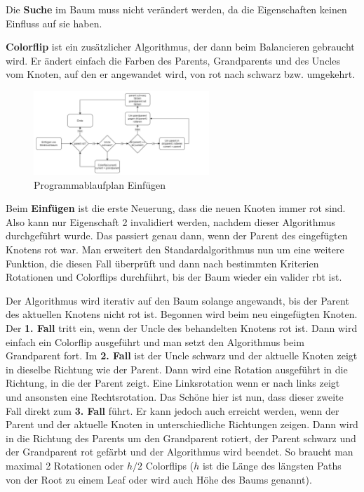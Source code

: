 \documentclass[11pt]{article}
\begin{document}
Die \textbf{Suche} im Baum muss nicht verändert werden, da die Eigenschaften keinen Einfluss auf sie haben. \cite[S. 221]{aic}

\textbf{Colorflip} ist ein zusätzlicher Algorithmus, der dann beim Balancieren gebraucht wird.
Er ändert einfach die Farben des Parents, Grandparents und des Uncles vom Knoten, auf den er angewandet wird, von rot nach schwarz bzw. umgekehrt.

\begin{figure}
  \centering
  \includegraphics[width=250px]{prog1.png}
  \caption{Programmablaufplan Einfügen}
\end{figure}

Beim \textbf{Einfügen} ist die erste Neuerung, dass die neuen Knoten immer rot sind. 
Also kann nur Eigenschaft 2 invalidiert werden, nachdem dieser Algorithmus durchgeführt wurde. 
Das passiert genau dann, wenn der Parent des eingefügten Knotens rot war. Man erweitert den Standardalgorithmus nun um eine weitere Funktion, 
die diesen Fall überprüft und dann nach bestimmten Kriterien Rotationen und Colorflips durchführt, bis der Baum wieder ein valider \gls{rbt} ist.

Der Algorithmus wird iterativ auf den Baum solange angewandt, bis der Parent des aktuellen Knotens nicht rot ist. 
Begonnen wird beim neu eingefügten Knoten. Der \textbf{1. Fall} tritt ein, wenn der Uncle des behandelten Knotens rot ist. 
Dann wird einfach ein Colorflip ausgeführt und man setzt den Algorithmus beim Grandparent fort.
Im \textbf{2. Fall} ist der Uncle schwarz und der aktuelle Knoten zeigt in dieselbe Richtung wie der Parent. 
Dann wird eine Rotation ausgeführt in die Richtung, in die der Parent zeigt. Eine Linksrotation wenn er nach links zeigt und ansonsten eine Rechtsrotation.
Das Schöne hier ist nun, dass dieser zweite Fall direkt zum \textbf{3. Fall} führt.
Er kann jedoch auch erreicht werden, wenn der Parent und der aktuelle Knoten in unterschiedliche Richtungen zeigen. Dann wird in die Richtung des Parents um den Grandparent rotiert, der Parent schwarz und der Grandparent rot gefärbt und der Algorithmus wird beendet.
So braucht man maximal 2 Rotationen oder $h/2$ Colorflips ($h$ ist die Länge des längsten Paths von der Root zu einem Leaf oder wird auch Höhe des Baums genannt).
\end{document}
